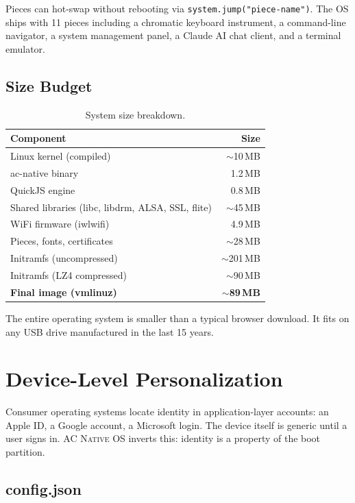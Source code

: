 \documentclass[10pt,letterpaper,twocolumn]{article}
\newcommand{\acos}{\textsc{AC Native OS}}
\begin{document}
Pieces can hot-swap without rebooting via \texttt{system.jump("piece-name")}. The OS ships with 11 pieces including a chromatic keyboard instrument, a command-line navigator, a system management panel, a Claude AI chat client, and a terminal emulator.

\subsection{Size Budget}

\begin{table}[h]
\small
\centering
\begin{tabular}{lr}
\toprule
\textbf{Component} & \textbf{Size} \\
\midrule
Linux kernel (compiled) & $\sim$10\,MB \\
ac-native binary & 1.2\,MB \\
QuickJS engine & 0.8\,MB \\
Shared libraries (libc, libdrm, ALSA, SSL, flite) & $\sim$45\,MB \\
WiFi firmware (iwlwifi) & 4.9\,MB \\
Pieces, fonts, certificates & $\sim$28\,MB \\
\midrule
Initramfs (uncompressed) & $\sim$201\,MB \\
Initramfs (LZ4 compressed) & $\sim$90\,MB \\
\textbf{Final image (vmlinuz)} & \textbf{$\sim$89\,MB} \\
\bottomrule
\end{tabular}
\caption{System size breakdown.}
\label{tab:size}
\end{table}

The entire operating system is smaller than a typical browser download. It fits on any USB drive manufactured in the last 15 years.


\section{Device-Level Personalization}
\label{sec:personalization}

Consumer operating systems locate identity in application-layer accounts: an Apple ID, a Google account, a Microsoft login. The device itself is generic until a user signs in. \acos{} inverts this: identity is a property of the boot partition.

\subsection{config.json}
\end{document}

